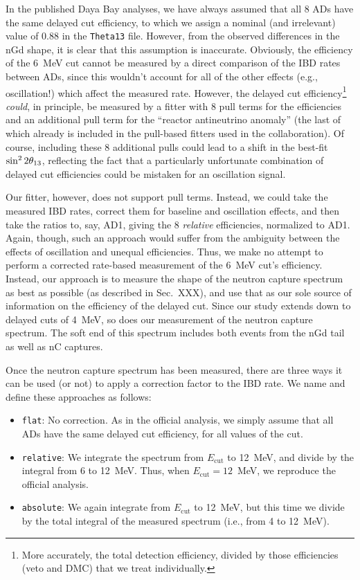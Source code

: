 \documentclass[../thesis.tex]{subfiles}
\begin{document}
In the published Daya Bay analyses, we have always assumed that all 8 ADs have the same delayed cut efficiency, to which we assign a nominal (and irrelevant) value of 0.88 in the \texttt{Theta13} file. However, from the observed differences in the nGd shape, it is clear that this assumption is inaccurate. Obviously, the efficiency of the 6~MeV cut cannot be measured by a direct comparison of the IBD rates between ADs, since this wouldn't account for all of the other effects (e.g., oscillation!) which affect the measured rate. However, the delayed cut efficiency\footnote{More accurately, the total detection efficiency, divided by those efficiencies (veto and DMC) that we treat individually.} \emph{could}, in principle, be measured by a fitter with 8 pull terms for the efficiencies and an additional pull term for the ``reactor antineutrino anomaly'' (the last of which already is included in the pull-based fitters used in the collaboration). Of course, including these 8 additional pulls could lead to a shift in the best-fit $\sin^2 2\theta_{13}$, reflecting the fact that a particularly unfortunate combination of delayed cut efficiencies could be mistaken for an oscillation signal.

Our fitter, however, does not support pull terms. Instead, we could take the measured IBD rates, correct them for baseline and oscillation effects, and then take the ratios to, say, AD1, giving the 8 \emph{relative} efficiencies, normalized to AD1. Again, though, such an approach would suffer from the ambiguity between the effects of oscillation and unequal efficiencies. Thus, we make no attempt to perform a corrected rate-based measurement of the 6~MeV cut's efficiency. Instead, our approach is to measure the shape of the neutron capture spectrum as best as possible (as described in Sec.~XXX), and use that as our sole source of information on the efficiency of the delayed cut. Since our study extends down to delayed cuts of 4~MeV, so does our measurement of the neutron capture spectrum. The soft end of this spectrum includes both events from the nGd tail as well as nC captures.

Once the neutron capture spectrum has been measured, there are three ways it can be used (or not) to apply a correction factor to the IBD rate. We name and define these approaches as follows:

\begin{itemize}
\item \texttt{flat}: No correction. As in the official analysis, we simply assume that all ADs have the same delayed cut efficiency, for all values of the cut.
\item \texttt{relative}: We integrate the spectrum from $E_{\mathrm{cut}}$ to 12~MeV, and divide by the integral from 6 to 12~MeV. Thus, when $E_{\mathrm{cut}} = 12$~MeV, we reproduce the official analysis.
\item \texttt{absolute}: We again integrate from $E_{\mathrm{cut}}$ to 12~MeV, but this time we divide by the total integral of the measured spectrum (i.e., from 4 to 12~MeV).
\end{itemize}
\end{document}
